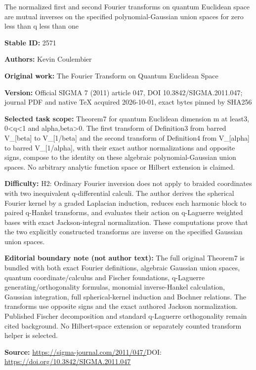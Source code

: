 \documentclass[11pt]{article}
\numberwithin{equation}{section}
\begin{document}
\begin{center}\Large The normalized first and second Fourier transforms on quantum Euclidean space are mutual inverses on the specified polynomial-Gaussian union spaces for zero less than q less than one\end{center}
\noindent\textbf{Stable ID:} 2571\par
\noindent\textbf{Authors:} Kevin Coulembier\par
\noindent\textbf{Original work:} The Fourier Transform on Quantum Euclidean Space\par
\noindent\textbf{Version:} Official SIGMA 7 (2011) article 047, DOI 10.3842/SIGMA.2011.047; journal PDF and native TeX acquired 2026-10-01, exact bytes pinned by SHA256\par
\noindent\textbf{Selected task scope:} Theorem7 for quantum Euclidean dimension m at least3, 0<q<1 and alpha,beta>0. The first transform of Definition3 from barred V\_[beta] to V\_[1/beta] and the second transform of Definition4 from V\_[alpha] to barred V\_[1/alpha], with their exact author normalizations and opposite signs, compose to the identity on these algebraic polynomial-Gaussian union spaces. No arbitrary analytic function space or Hilbert extension is claimed.\par
\noindent\textbf{Difficulty:} H2: Ordinary Fourier inversion does not apply to braided coordinates with two inequivalent q-differential calculi. The author derives the spherical Fourier kernel by a graded Laplacian induction, reduces each harmonic block to paired q-Hankel transforms, and evaluates their action on q-Laguerre weighted bases with exact Jackson-integral normalization. These computations prove that the two explicitly constructed transforms are inverse on the specified Gaussian union spaces.\par
\noindent\textbf{Editorial boundary note (not author text):} The full original Theorem7 is bundled with both exact Fourier definitions, algebraic Gaussian union spaces, quantum coordinate/calculus and Fischer foundations, q-Laguerre generating/orthogonality formulas, monomial inverse-Hankel calculation, Gaussian integration, full spherical-kernel induction and Bochner relations. The transforms use opposite signs and the exact authored Jackson normalization. Published Fischer decomposition and standard q-Laguerre orthogonality remain cited background. No Hilbert-space extension or separately counted transform helper is selected.\par
\noindent\textbf{Source:} \url{https://sigma-journal.com/2011/047/}\quad DOI: \url{https://doi.org/10.3842/SIGMA.2011.047}\par
\end{document}
